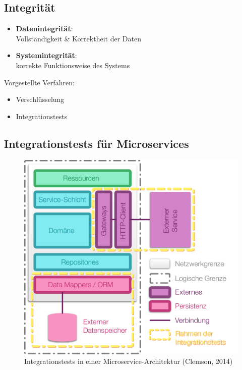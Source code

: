 \documentclass{beamer}
\begin{document}
\subsection{Integrität}
\begin{frame}{\insertsubsection}
	\begin{itemize}
		\item \textbf{Datenintegrität}:\\
			Vollständigkeit \& Korrektheit der Daten
		\item \textbf{Systemintegrität}:\\
			korrekte Funktionsweise des Systems
	\end{itemize}
	\vspace*{1cm}
	\pause
	Vorgestellte Verfahren:
	\begin{itemize}
		\item Verschlüsselung
		\item Integrationstests
	\end{itemize}
\end{frame}

\subsection{Integrationstests für Microservices}
\begin{frame}{\insertsubsection}
	\begin{figure}[h]
		\centering
		\includegraphics[width=.6\linewidth]{img/inte}
		\caption{Integrationstests in einer Microservice-Architektur (Clemson, 2014)}
		\label{fig:integrationstests}
	\end{figure}
\end{frame}
\end{document}
